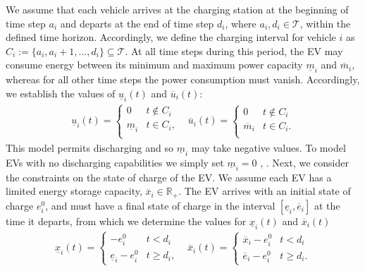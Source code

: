 We assume that each vehicle arrives at the charging station at the beginning of time step $a_i$ and departs at the end of time step $d_i$, where $a_i, d_i \in \mathcal{T}$,  within the defined time horizon. Accordingly, we define the charging interval for vehicle $i$ as $C_i := \{a_i, a_i +1,...,d_i\} \subseteq \mathcal{T}$. 
At all time steps during this period, the EV may consume energy between its minimum and maximum power capacity $\underline{m}_i$ and $\overline{m}_i$, whereas for all other time steps the power consumption must vanish. Accordingly, we establish the values of $\underline{u}_i(t)$ and $\overline{u}_i(t)$:
\begin{equation*}
    \begin{array}{cc}
        \underline{u}_i(t) = 
        \begin{cases}
            0                   & t \notin C_i  \\
            \underline{m}_i     & t \in C_i,\\
        \end{cases}
        & 
        \overline{u}_i(t) = 
        \begin{cases}
            0                   & t \notin C_i \\
            \overline{m}_i     &  t \in C_i.\\
        \end{cases}
    \end{array}
\end{equation*}
This model permits discharging and so $\underline{m}_i$ may take negative values. To model EVs with no discharging capabilities we simply set $\underline{m}_i = 0$ \cite{Panda2024EfficientVehicles}, \cite{Mukhi2023AnVehicles}.
Next, we consider the constraints on the state of charge of the EV. We assume each EV has a limited energy storage capacity, $\overline{x}_i \in \mathbb{R}_+$. The EV arrives with an initial state of charge $e^0_{i}$, and must have a final state of charge in the interval $[\underline{e}_i, \overline{e}_i]$ at the time it departs, from which we determine the values for $\underline{x}_i(t)$ and $\overline{x}_i(t)$ \cite{Taha2024AnPopulations} \cite{Hao2014CharacterizingLoads} 
\begin{equation*}
    \begin{array}{cc}
        \underline{x}_i(t) = 
        \begin{cases}
            -e^0_{i}                  & t < d_i\\
            \underline{e}_i -e^0_{i}  & t \geq d_i,
        \end{cases} 
        & 
        \overline{x}_i(t) = 
        \begin{cases}
            \overline{x}_i -e^0_{i}   & t < d_i\\
            \overline{e}_i -e^0_{i}   & t \geq d_i.
        \end{cases} 
    \end{array}
\end{equation*}

